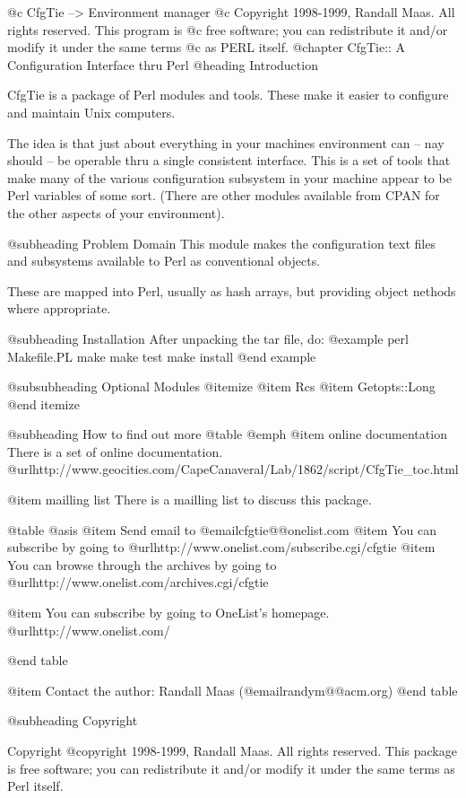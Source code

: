 @c CfgTie --> Environment manager
@c Copyright 1998-1999, Randall Maas.  All rights reserved.  This program is
@c free software; you can redistribute it and/or modify it under the same terms
@c as PERL itself.                                                                   
@chapter CfgTie:: A Configuration Interface thru Perl
@heading Introduction

CfgTie is a package of Perl modules and tools.  These make it easier to
configure and maintain Unix computers.

The idea is that just about everything in your machines environment can --
nay should -- be operable thru a single consistent interface.  This is a
set of tools that make many of the various configuration subsystem in your
machine appear to be Perl variables of some sort.  (There are other modules
available from CPAN for the other aspects of your environment).

@subheading Problem Domain
This module makes the configuration text files and subsystems available to
Perl as conventional objects.

These are mapped into Perl, usually as hash arrays, but providing object
nethods where appropriate.

@subheading Installation
After unpacking the tar file, do:
@example
        perl Makefile.PL 
        make 
        make test
        make install
@end example

@subsubheading Optional Modules
@itemize
@item Rcs
@item Getopts::Long
@end itemize

@subheading How to find out more
@table @emph
@item online documentation
There is a set of online documentation.
@url{http://www.geocities.com/CapeCanaveral/Lab/1862/script/CfgTie_toc.html}

@item mailling list
There is a mailling list to discuss this package.

@table @asis
@item Send email to @email{cfgtie@@onelist.com}
@item You can subscribe by going to
@url{http://www.onelist.com/subscribe.cgi/cfgtie}
@item You can browse through the archives by going to
 @url{http://www.onelist.com/archives.cgi/cfgtie}

@item You can subscribe by going to OneList's homepage.  @url{http://www.onelist.com/}

@end table

@item Contact the author:
Randall Maas (@email{randym@@acm.org})
@end table

@subheading Copyright

Copyright @copyright{} 1998-1999, Randall Maas. All rights reserved.  This
package is free software; you can redistribute it and/or modify it
under the same terms as Perl itself.

